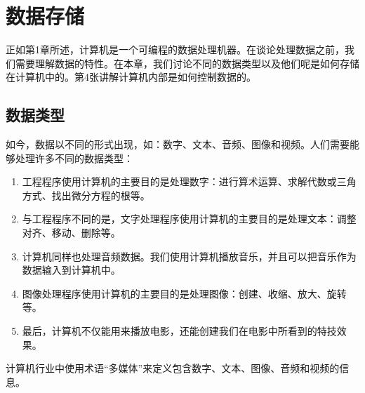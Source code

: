 \chapter{数据存储}
正如第1章所述，计算机是一个可编程的数据处理机器。在谈论处理数据之前，我们需要理解数据的特性。在本章，我们讨论不同的数据类型以及他们呢是如何存储在计算机中的。第4张讲解计算机内部是如何控制数据的。
\section{数据类型}
如今，数据以不同的形式出现，如：数字、文本、音频、图像和视频。人们需要能够处理许多不同的数据类型：
\begin{enumerate}
	\item 工程程序使用计算机的主要目的是处理数字：进行算术运算、求解代数或三角方式、找出微分方程的根等。
	\item 与工程程序不同的是，文字处理程序使用计算机的主要目的是处理文本：调整对齐、移动、删除等。
	\item 计算机同样也处理音频数据。我们使用计算机播放音乐，并且可以把音乐作为数据输入到计算机中。
	\item 图像处理程序使用计算机的主要目的是处理图像：创建、收缩、放大、旋转等。
	\item 最后，计算机不仅能用来播放电影，还能创建我们在电影中所看到的特技效果。
\end{enumerate}
计算机行业中使用术语“多媒体”来定义包含数字、文本、图像、音频和视频的信息。

